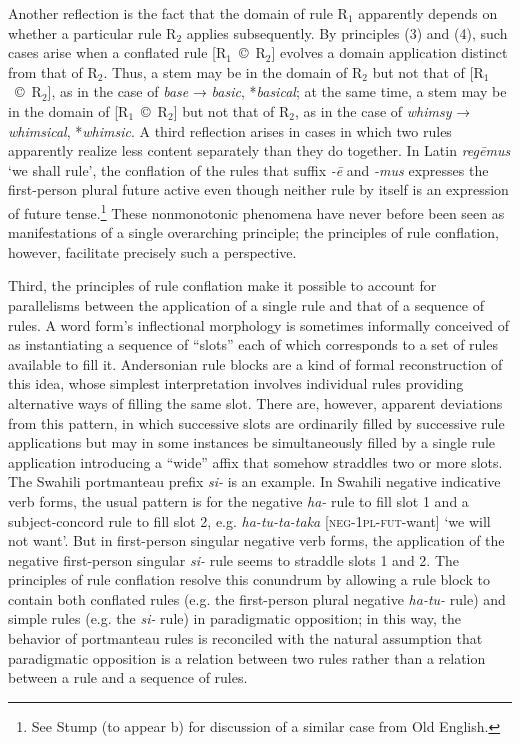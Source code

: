 \documentclass[output=paper,
modfonts
]{LSP/langsci}
\begin{document}
Another reflection is the fact that the domain of rule R$_{1}$ apparently depends on whether a particular rule R$_{2}$ applies subsequently.  By principles (3) and (4), such cases arise when a conflated rule [R$_{1}$~©~R$_{2}$] evolves a domain application distinct from that of R$_{2}$.  Thus, a stem may be in the domain of R$_{2}$ but not that of [R$_{1}$~©~R$_{2}$], as in the case of \textit{base} → \textit{basic}, *\textit{basical}; at the same time, a stem may be in the domain of [R$_{1}$~©~R$_{2}$] but not that of R$_{2}$, as in the case of \textit{whimsy} → \textit{whimsical}, *\textit{whimsic}.  A third reflection arises in cases in which two rules apparently realize less content separately than they do together. In Latin \textit{reg\=emus} ‘we shall rule’, the conflation of the rules that suffix \textit{\nobreakdash-\=e} and \textit{\nobreakdash-mus} expresses the first\nobreakdash-person plural future active even though neither rule by itself is an expression of future tense.\footnote{See Stump (to appear b) for discussion of a similar case from Old English.}  These nonmonotonic phenomena have never before been seen as manifestations of a single overarching principle; the principles of rule conflation, however, facilitate precisely such a perspective.

Third, the principles of rule conflation make it possible to account for  parallelisms between the application of a single rule and that of a sequence of rules.  A word form’s inflectional morphology is sometimes informally conceived of as instantiating a sequence of “slots” each of which corresponds to a set of rules available to fill it.  Andersonian rule blocks are a kind of formal reconstruction of this idea, whose simplest interpretation involves individual rules providing alternative ways of filling the same slot.  There are, however, apparent deviations from this pattern, in which successive slots are ordinarily filled by successive rule applications but may in some instances be simultaneously filled by a single rule application introducing a “wide” affix that somehow straddles two or more slots. The Swahili portmanteau prefix \textit{si\nobreakdash-} is an example.  In Swahili negative indicative verb forms,  the usual pattern is for the negative \textit{ha\nobreakdash-} rule to fill slot 1 and a subject\nobreakdash-concord rule to fill slot 2, e.g. \textit{ha\nobreakdash-tu\nobreakdash-ta\nobreakdash-taka} [\textsc{neg\nobreakdash-1pl\nobreakdash-fut\nobreakdash-}want] ‘we will not want’.  But in first\nobreakdash-person singular negative verb forms, the application of the negative first\nobreakdash-person singular \textit{si\nobreakdash-} rule seems to straddle slots 1 and 2.  The principles of rule conflation resolve this conundrum by allowing a rule block to contain both conflated rules (e.g. the first\nobreakdash-person plural negative \textit{ha\nobreakdash-tu\nobreakdash-} rule) and simple rules (e.g. the \textit{si\nobreakdash-} rule) in paradigmatic opposition; in this way, the behavior of portmanteau rules is reconciled with the natural assumption that paradigmatic opposition is a relation between two rules rather than a relation between a rule and a sequence of rules. 
\end{document}
